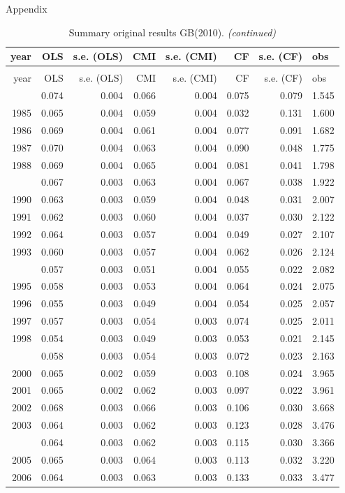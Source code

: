 \documentclass[10pt,ignorenonframetext,]{beamer}
\begin{document}
\begin{frame}[allowframebreaks]{Appendix}
\protect\hypertarget{appendix}{}

\begingroup\fontsize{7}{9}\selectfont

\begin{longtable}[t]{rrrrrrrl}
\caption{\label{tab:unnamed-chunk-3}Summary original results GB(2010).}\\
\toprule
year & OLS & s.e. (OLS) & CMI & s.e. (CMI) & CF & s.e. (CF) & obs\\
\midrule
\endfirsthead
\caption[]{Summary original results GB(2010). \textit{(continued)}}\\
\toprule
year & OLS & s.e. (OLS) & CMI & s.e. (CMI) & CF & s.e. (CF) & obs\\
\midrule
\endhead
\
\endfoot
\bottomrule
\endlastfoot
1984 & 0.074 & 0.004 & 0.066 & 0.004 & 0.075 & 0.079 & 1.545\\
1985 & 0.065 & 0.004 & 0.059 & 0.004 & 0.032 & 0.131 & 1.600\\
1986 & 0.069 & 0.004 & 0.061 & 0.004 & 0.077 & 0.091 & 1.682\\
1987 & 0.070 & 0.004 & 0.063 & 0.004 & 0.090 & 0.048 & 1.775\\
1988 & 0.069 & 0.004 & 0.065 & 0.004 & 0.081 & 0.041 & 1.798\\
\addlinespace
1989 & 0.067 & 0.003 & 0.063 & 0.004 & 0.067 & 0.038 & 1.922\\
1990 & 0.063 & 0.003 & 0.059 & 0.004 & 0.048 & 0.031 & 2.007\\
1991 & 0.062 & 0.003 & 0.060 & 0.004 & 0.037 & 0.030 & 2.122\\
1992 & 0.064 & 0.003 & 0.057 & 0.004 & 0.049 & 0.027 & 2.107\\
1993 & 0.060 & 0.003 & 0.057 & 0.004 & 0.062 & 0.026 & 2.124\\
\addlinespace
1994 & 0.057 & 0.003 & 0.051 & 0.004 & 0.055 & 0.022 & 2.082\\
1995 & 0.058 & 0.003 & 0.053 & 0.004 & 0.064 & 0.024 & 2.075\\
1996 & 0.055 & 0.003 & 0.049 & 0.004 & 0.054 & 0.025 & 2.057\\
1997 & 0.057 & 0.003 & 0.054 & 0.003 & 0.074 & 0.025 & 2.011\\
1998 & 0.054 & 0.003 & 0.049 & 0.003 & 0.053 & 0.021 & 2.145\\
\addlinespace
1999 & 0.058 & 0.003 & 0.054 & 0.003 & 0.072 & 0.023 & 2.163\\
2000 & 0.065 & 0.002 & 0.059 & 0.003 & 0.108 & 0.024 & 3.965\\
2001 & 0.065 & 0.002 & 0.062 & 0.003 & 0.097 & 0.022 & 3.961\\
2002 & 0.068 & 0.003 & 0.066 & 0.003 & 0.106 & 0.030 & 3.668\\
2003 & 0.064 & 0.003 & 0.062 & 0.003 & 0.123 & 0.028 & 3.476\\
\addlinespace
2004 & 0.064 & 0.003 & 0.062 & 0.003 & 0.115 & 0.030 & 3.366\\
2005 & 0.065 & 0.003 & 0.064 & 0.003 & 0.113 & 0.032 & 3.220\\
2006 & 0.064 & 0.003 & 0.063 & 0.003 & 0.133 & 0.033 & 3.477\\*
\end{longtable}\endgroup{}


\end{frame}
\end{document}
